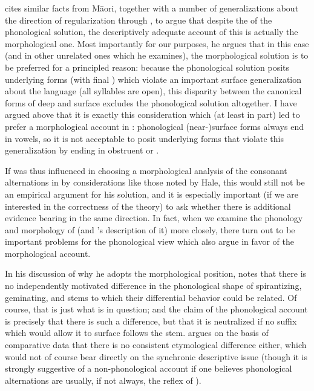 \citet{hale73:lardil} cites similar facts from Māori, together with a
number of generalizations about the direction of regularization
through , to argue that despite the  of the
phonological solution, the descriptively adequate account of this
 is actually the morphological one. Most importantly for our
purposes, he argues that in this case (and in other unrelated ones
which he examines), the morphological solution is to be preferred for
a principled reason: because the phonological solution posits
underlying forms (with final ) which violate an important
surface generalization about the language (all syllables are open),
this disparity between the canonical forms of deep and surface
 excludes the phonological solution altogether. I have
argued above that it is exactly this consideration which (at least in
part) led {\Sapir} to prefer a morphological account in :
phonological \mbox{(near-)}surface forms always end in vowels, so it is not
acceptable to posit underlying forms that violate this generalization
by ending in obstruent or .

If {\Sapir} was thus influenced in choosing a morphological analysis of
the consonant alternations in  by considerations like
those noted by Hale, this would still not be an empirical argument for
his solution, and it is especially important (if we are interested in
the correctness of the theory) to ask whether there is additional
evidence bearing in the same direction. In fact, when we examine the
phonology and morphology of  (and {\Sapir}'s description
of it) more closely, there turn out to be important problems for the
phonological view which also argue in favor of the morphological
account.

In his discussion of why he adopts the morphological position, {\Sapir}
notes that there is no independently motivated difference in the
phonological shape of spirantizing, geminating, and  stems
to which their differential behavior could be related. Of course, that
is just what is in question; and the claim of the phonological account
is precisely that there is such a difference, but that it is
neutralized if no suffix which would allow it to surface follows the
stem. {\Sapir} argues on the basis of comparative data that there is no
consistent etymological difference either, which would not of course
bear directly on the synchronic descriptive issue (though it is
strongly suggestive of a non-phonological account if one believes
phonological alternations are usually, if not always, the reflex of
).

